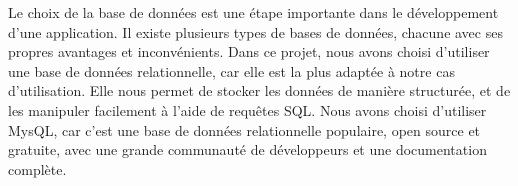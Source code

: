 Le choix de la base de données est une étape importante dans le développement
d'une application. Il existe plusieurs types de bases de données, chacune avec
ses propres avantages et inconvénients. Dans ce projet, nous avons choisi
d'utiliser une base de données relationnelle, car elle est la plus adaptée à
notre cas d'utilisation. Elle nous permet de stocker les données de manière
structurée, et de les manipuler facilement à l'aide de requêtes SQL. Nous avons
choisi d'utiliser MysQL, car c'est une base de données relationnelle
populaire, open source et gratuite, avec une grande communauté de développeurs
et une documentation complète.
